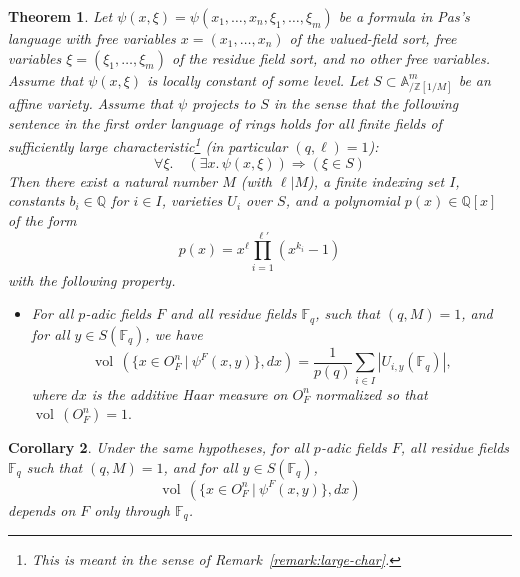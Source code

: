 \documentclass[11pt]{amsart}
\newtheorem{theorem}{Theorem}[section]
\newtheorem{corollary}[theorem]{Corollary}
\theoremstyle{definition}
\theoremstyle{remark}
\numberwithin{equation}{theorem}
\def\f{{\mathbb{F}_q}}
\def\tq{{\ \vert\ }}
\newcommand{\ring}[1]{\mathbb{#1}}
\def\op#1{\operatorname{#1}}
\begin{document}
\begin{theorem}\label{thm:existU}  Let $\psi(x,\xi) =
\psi(x_1,\ldots,x_n,\xi_1,\ldots,\xi_m)$ be a formula in Pas's
language with free variables $x=(x_1,\ldots,x_n)$ of the
valued-field sort, free variables $\xi = (\xi_1,\ldots,\xi_m)$ of
the residue field sort, and no other free variables.  Assume that
$\psi(x,\xi)$ is locally constant of some level.  Let $S\subset
\ring{A}^m_{/\ring{Z}[1/M]}$ be an affine variety.  Assume that
$\psi$ projects to $S$ in the sense that the following sentence in
the first order language of rings holds for all finite fields of
sufficiently large characteristic\footnote{This is meant in the
sense of Remark~\ref{remark:large-char}.} (in particular
$(q,\ell)=1$):
   \begin{equation}
   \forall\xi.\quad
   (\exists x.\, \psi{(x,\xi)})
   \Rightarrow (\xi\in S)
   \label{eqn:S}
   \end{equation}
Then there exist a natural number $M$ (with $\ell | M$), a finite
indexing set $I$, constants $b_i\in\ring{Q}$ for $i\in I$,
varieties $U_i$ over $S$, and a polynomial $p(x)\in\ring{Q}[x]$ of
the form
   \begin{equation}p(x) = x^\ell \prod_{i=1}^{\ell'}
    (x^{k_i}-1)
    \end{equation} with the following property.
\begin{itemize}
   \item
   For all $p$-adic fields $F$ and all residue fields $\f$, such
   that $(q,M)=1$, and for all $y \in S(\f)$, we have
   \begin{equation}
   \op{vol}\,(\{ x\in O_F^n \tq \psi^F(x,y)\},dx) =
   \frac{1}{p(q)}\sum_{i\in I} |U_{i,y}(\f)|,
   \label{eqn:volU}
   \end{equation}
where $dx$ is the additive Haar measure on $O_F^n$ normalized so
that $\op{vol}\,(O_F^n) = 1.$
\end{itemize}
\end{theorem}

\begin{corollary} Under the same hypotheses, for all $p$-adic
fields $F$, all residue fields $\f$ such
   that $(q,M)=1$, and for all $y \in S(\f)$,
    $$
    \op{vol}\,(\{ x\in O_F^n \tq \psi^F(x,y)\},dx)
    $$
    depends on $F$ only through $\f$.
\end{corollary}
\end{document}
